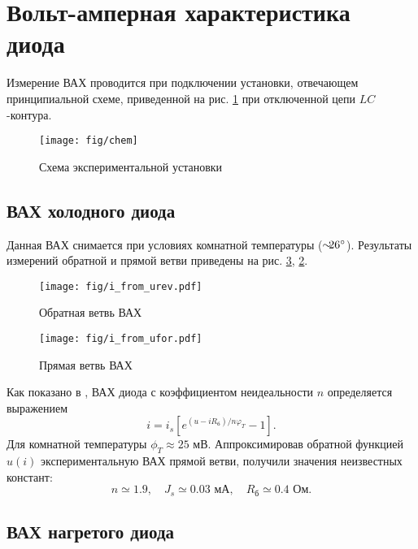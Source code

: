 \documentclass[a4paper,14pt]{extarticle}
\begin{document}
\newpage


\section{Вольт-амперная характеристика диода}
Измерение ВАХ проводится при подключении установки, отвечающем принципиальной схеме, приведенной на рис. \ref{fig:chem} при отключенной цепи $LC$-контура. 

\begin{figure}[h!]
	\centering
	\texttt{[image: fig/chem]}
	\caption{Схема экспериментальной установки}
	\label{fig:chem}
\end{figure}


\subsection{ВАХ холодного диода}
Данная ВАХ снимается при условиях комнатной температуры ($\sim\hspace{-0.5em}26^\circ$). Результаты измерений обратной и прямой ветви приведены на рис. \ref{fig:vax1}, \ref{fig:vax1obr}.
\begin{figure}[H]
	\centering
	\texttt{[image: fig/i\_from\_urev.pdf]}
	\vspace{-1em}
	\caption{Обратная ветвь ВАХ}
	\label{fig:vax1obr}
\end{figure}
\begin{figure}[H]
	\centering
	\texttt{[image: fig/i\_from\_ufor.pdf]}
	\vspace{-1em}
	\caption{Прямая ветвь ВАХ}
	\label{fig:vax1}
\end{figure}
Как показано в \cite[стр. 15]{met}, ВАХ диода с коэффициентом неидеальности $n$ определяется выражением
\begin{equation}
    i=i_s[e^{(u-iR_{\text{б}})/n \varphi_T}-1].
    \label{eq:id}
\end{equation}
Для комнатной температуры $\phi_T\approx 25$ мВ. Аппроксимировав обратной функцией $u(i)$ экспериментальную ВАХ прямой ветви, получили значения неизвестных констант:
\begin{equation}
    n \simeq 1.9,\quad J_s \simeq 0.03  \text{ мА},\quad R_{\text{б}} \simeq 0.4 \text{ Ом}.
\end{equation}



\subsection{ВАХ нагретого диода}
\end{document}
